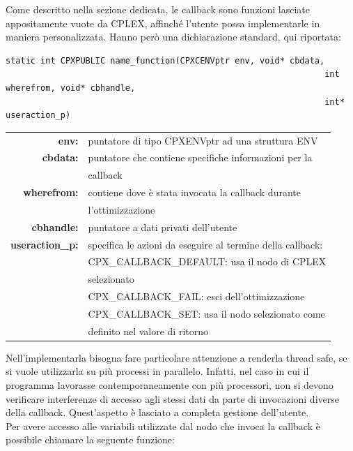 Come descritto nella sezione dedicata, le callback sono funzioni lasciate appositamente vuote da CPLEX, affinché l'utente possa implementarle in maniera personalizzata. Hanno però una dichiarazione standard, qui riportata: 
\begin{center}
\begin{lstlisting}[linewidth=380pt, basicstyle=\footnotesize\sffamily,]     
static int CPXPUBLIC name_function(CPXCENVptr env, void* cbdata, 
								   								int wherefrom, void* cbhandle, 	
								   								int* useraction_p)
\end{lstlisting}
\end{center}
\begin{table}[h]
\centering
\begin{tabular}{rl}
\textbf{env:} & {puntatore di tipo CPXENVptr ad una struttura ENV}\\
\textbf{cbdata:} & {puntatore che contiene specifiche informazioni per la}\\
&{callback}\\
\textbf{wherefrom:} & {contiene dove è stata invocata la callback durante} \\ 
&{l'ottimizzazione}\\
\textbf{cbhandle:} & {puntatore a dati privati dell'utente} \\
\textbf{useraction\_p:} & {specifica le azioni da eseguire al termine della callback:}\\
& {CPX\_CALLBACK\_DEFAULT: usa il nodo di CPLEX}\\
&{selezionato}\\
& {CPX\_CALLBACK\_FAIL: esci dell'ottimizzazione}\\
& {CPX\_CALLBACK\_SET: usa il nodo selezionato come}\\  
& {definito nel valore di ritorno}\\            
\end{tabular}
\end{table} 
Nell'implementarla bisogna fare particolare attenzione a renderla thread safe, se si vuole utilizzarla su più processi in parallelo. Infatti, nel caso in cui il programma lavorasse contemporaneamente con più processori, non si devono verificare interferenze di accesso agli stessi dati da parte di invocazioni diverse della callback. Quest'aspetto è lasciato a completa gestione dell'utente.\\
Per avere accesso alle variabili utilizzate dal nodo che invoca la callback è possibile chiamare la seguente funzione:
